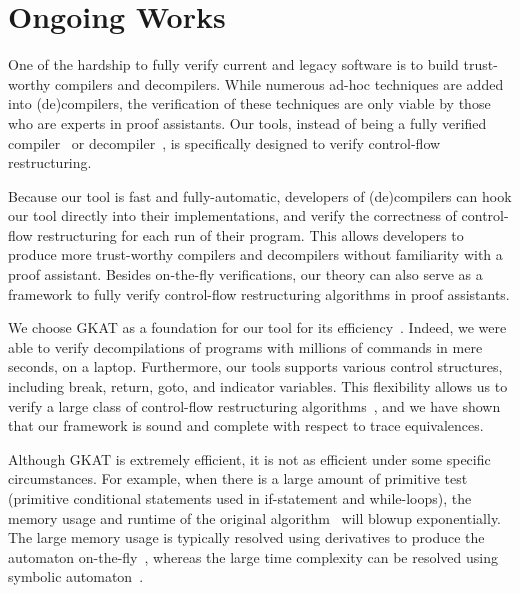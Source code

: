 \documentclass[11pt,a4paper,sans]{moderncv} %
\begin{document}
\section{Ongoing Works}


One of the hardship to fully verify current and legacy software is to build trust-worthy compilers and decompilers. 
While numerous ad-hoc techniques are added into (de)compilers, the verification of these techniques are only viable by those who are experts in proof assistants.
Our tools, instead of being a fully verified compiler~\cite{leroy_FormalVerificationRealistic_2009} or decompiler~\cite{verbeek_FormallyVerifiedLifting_2022}, is specifically designed to verify control-flow restructuring. 

Because our tool is fast and fully-automatic, developers of (de)compilers can hook our tool directly into their implementations, and verify the correctness of control-flow restructuring for each run of their program. 
This allows developers to produce more trust-worthy compilers and decompilers without familiarity with a proof assistant. 
Besides on-the-fly verifications, our theory can also serve as a framework to fully verify control-flow restructuring algorithms in proof assistants.

We choose GKAT as a foundation for our tool for its efficiency~\cite{smolka_GuardedKleeneAlgebra_2020}. Indeed, we were able to verify decompilations of programs with millions of commands in mere seconds, on a laptop. Furthermore, our tools supports various control structures, including break, return, goto, and indicator variables. This flexibility allows us to verify a large class of control-flow restructuring algorithms~\cite{yakdan_NoMoreGotos_2015,basque_AhoySAILRThere_,erosa_TamingControlFlow_1994,kozen_CertificationCompilerOptimizations_2000a}, and we have shown that our framework is sound and complete with respect to trace equivalences.


Although GKAT is extremely efficient, it is not as efficient under some specific circumstances. 
For example, when there is a large amount of primitive test (primitive conditional statements used in if-statement and while-loops), the memory usage and runtime of the original algorithm~\cite{smolka_GuardedKleeneAlgebra_2020} will blowup exponentially. 
The large memory usage is typically resolved using derivatives to produce the automaton on-the-fly~\cite{brzozowski_DerivativesRegularExpressions_1964, schmid_GuardedKleeneAlgebra_2021}, whereas the large time complexity can be resolved using symbolic automaton~\cite{pous_SymbolicAlgorithmsLanguage_2015}. 
\end{document}
